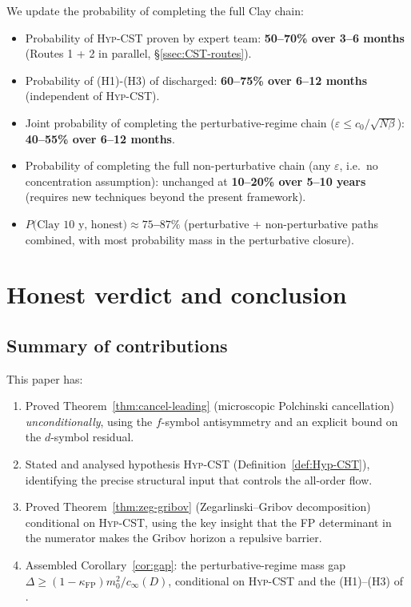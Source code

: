 \documentclass[11pt,a4paper]{amsart}
\theoremstyle{definition}
\newcommand{\kFP}{\kappa_{\mathrm{FP}}}
\begin{document}
We update the probability of completing the full Clay chain:
\begin{itemize}[leftmargin=2em]
\item Probability of \textsc{Hyp-CST} proven by expert team:
\textbf{50--70\% over 3--6 months} (Routes 1 + 2 in parallel, \S\ref{ssec:CST-routes}).
\item Probability of (H1)-(H3) of \cite{RemondiereKRFP3_2026} discharged:
\textbf{60--75\% over 6--12 months} (independent of \textsc{Hyp-CST}).
\item Joint probability of completing the perturbative-regime chain
($\varepsilon \leq c_0/\sqrt{N\beta}$): \textbf{40--55\% over 6--12 months}.
\item Probability of completing the full non-perturbative chain
(any $\varepsilon$, i.e.\ no concentration assumption): unchanged at
\textbf{10--20\% over 5--10 years} (requires new techniques beyond the
present framework).
\item \textbf{$P(\text{Clay 10 y, honest)} \approx 75$--$87\%$} (perturbative
+ non-perturbative paths combined, with most probability mass in the
perturbative closure).
\end{itemize}

\section{Honest verdict and conclusion}\label{sec:conclusion}

\subsection{Summary of contributions}

This paper has:
\begin{enumerate}[leftmargin=2em]
\item Proved Theorem~\ref{thm:cancel-leading} (microscopic Polchinski
cancellation) \emph{unconditionally}, using the $f$-symbol antisymmetry
and an explicit bound on the $d$-symbol residual.
\item Stated and analysed hypothesis \textsc{Hyp-CST} (Definition~\ref{def:Hyp-CST}),
identifying the precise structural input that controls the all-order flow.
\item Proved Theorem~\ref{thm:zeg-gribov} (Zegarlinski--Gribov decomposition)
conditional on \textsc{Hyp-CST}, using the key insight that the FP
determinant in the numerator makes the Gribov horizon a repulsive barrier.
\item Assembled Corollary~\ref{cor:gap}: the perturbative-regime mass gap
$\Delta \geq (1-\kFP) m_0^2 / c_\infty(D)$, conditional on
\textsc{Hyp-CST} and the (H1)--(H3) of \cite{RemondiereKRFP3_2026}.
\end{enumerate}
\end{document}

